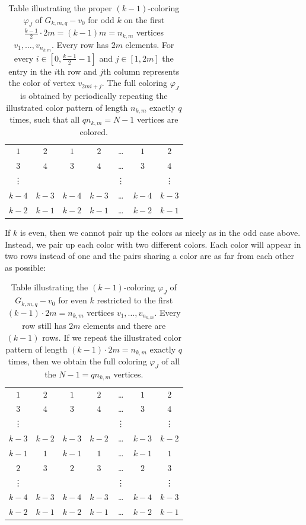 \documentclass[a4paper,10pt,hidelinks]{amsart}
\renewcommand{\phi}{\ensuremath{\varphi}}
\theoremstyle{definition}
\begin{document}
\begin{table}[H]
    \centering
\begin{tabular}{c c c c c c c}
    $1$& $2$& $1$& $2$& \dots& $1$& $2$\\
    $3$& $4$& $3$& $4$& \dots& $3$& $4$\\
    \vdots& & & &\vdots & &\vdots \\
    $k-4$& $k-3$& $k-4$& $k-3$& \dots& $k-4$& $k-3$\\
    $k-2$& $k-1$& $k-2$& $k-1$& \dots& $k-2$& $k-1$\\
\end{tabular}
\caption{Table illustrating the proper $(k-1)$-coloring $\varphi_J$ of $G_{k,m,q}-v_0$ for odd $k$ on the first $\frac{k-1}{2}\cdot 2m=(k-1)m=n_{k,m}$ vertices $v_1,\ldots,v_{n_{k,m}}$. Every row has $2m$ elements. For every $i \in \left[0, \frac{k - 1}{2} - 1\right]$ and $j \in [1, 2m]$ the entry in the $i$th row and $j$th column  represents the color of vertex $v_{2mi + j}$. The full coloring $\phi_J$ is obtained by periodically repeating the illustrated color pattern of length $n_{k,m}$ exactly $q$ times, such that all $qn_{k,m}=N-1$ vertices are colored.\label{table-odd-coloring}}
\end{table}

If $k$ is even, then we cannot pair up the colors as nicely as in the odd case above. Instead, we pair up each color with two different colors. Each color will appear in two rows instead of one and the pairs sharing a color are as far from each other as possible:
\begin{table}[H]
    \centering
\begin{tabular}{c c c c c c c}
    $1$& $2$& $1$& $2$& \dots& $1$& $2$\\
    $3$& $4$& $3$& $4$& \dots& $3$& $4$\\
    \vdots& & & &\vdots & &\vdots \\
    $k-3$& $k-2$& $k-3$& $k-2$& \dots& $k-3$& $k-2$\\
    $k-1$& $1$& $k-1$& $1$& \dots& $k-1$& $1$\\
    $2$& $3$& $2$& $3$& \dots& $2$& $3$\\
    \vdots& & & &\vdots & &\vdots \\
    $k-4$& $k-3$& $k-4$& $k-3$& \dots& $k-4$& $k-3$\\
    $k-2$& $k-1$& $k-2$& $k-1$& \dots& $k-2$& $k-1$\\
\end{tabular}
\caption{Table illustrating the $(k-1)$-coloring $\varphi_J$ of $G_{k,m,q}-v_0$  for even $k$ restricted to the first $(k-1)\cdot 2m=n_{k,m}$ vertices $v_1,\ldots,v_{n_{k,m}}$. Every row still has $2m$ elements and there are $(k - 1)$ rows. If we repeat the illustrated color pattern of length $(k-1)\cdot 2m=n_{k,m}$ exactly $q$ times, then we obtain the full coloring $\phi_J$ of all the $N-1=qn_{k,m}$ vertices.\label{table-even-coloring}}
\end{table}
\end{document}
